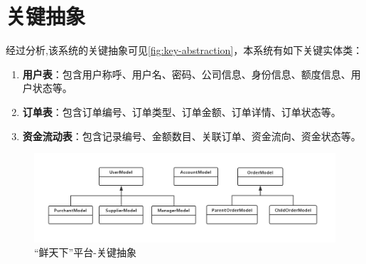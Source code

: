 \section{关键抽象}

经过分析,该系统的关键抽象可见\autoref{fig:key-abstraction}，本系统有如下关键实体类：

\begin{enumerate}
    \item \textbf{用户表}：包含用户称呼、用户名、密码、公司信息、身份信息、额度信息、用户状态等。
    \item \textbf{订单表}：包含订单编号、订单类型、订单金额、订单详情、订单状态等。
    \item \textbf{资金流动表}：包含记录编号、金额数目、关联订单、资金流向、资金状态等。
\end{enumerate}


\begin{figure}[htp]
    \centering
    \includegraphics[width=15cm]{figure/key-abstraction.png}
    \caption{“鲜天下”平台-关键抽象}
    \label{fig:key-abstraction}
\end{figure}
